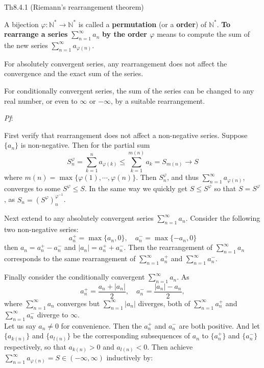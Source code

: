 \documentclass{article}
\begin{document}
\begin{Th}{Th8.4.1 (Riemann's rearrangement theorem)}
    \begin{compactenum}
        \item \textcolor{Df}{A bijection $\varphi: \mathbb{N}^\ast\rightarrow\mathbb{N}^\ast$ is called a \textbf{permutation} (or a \textbf{order}) of $\mathbb{N}^\ast$. \textbf{To rearrange a series } $\sum_{n=1}^{\infty} a_n$ \textbf{by the order $\varphi$} means to compute the sum of the new series $\sum_{n=1}^{\infty} a_{\varphi(n)}$.}
        \item For absolutely convergent series, any rearrangement does not affect the convergence and the exact sum of the series.
        \item For conditionally convergent series, the sum of the series can be changed to any real number, or even to $\infty$ or $-\infty$, by a suitable rearrangement. 
    \end{compactenum}
    \tcblower
    \textit{Pf}: 
    \begin{compactenum}
        \item First verify that rearrangement does not affect a non-negative series. Suppose $\{a_n\}$ is non-negative. Then for the partial sum 
        $$ S_n^\varphi = \sum_{k=1}^{n} a_{\varphi(k)} \leq \sum_{k=1}^{m(n)} a_k = S_{m(n)} \rightarrow S $$
        where $m(n) = \max\{\varphi(1), \cdots, \varphi(n)\}$. Then $S_n^\varphi$, and thus $\sum_{n=1}^{\infty} a_{\varphi(n)}$, converges to some $S^\varphi\leq S$. In the same way we quickly get $S\leq S^\varphi$ so that $S = S^\varphi$, as $S_n = (S^\varphi)_n^{\varphi^{-1}}$.
        \item Next extend to any absolutely convergent series $\sum_{n=1}^{\infty} a_n$. Consider the following two non-negative series:
        $$ a_n^+ = \max\{a_n, 0\}, \quad a_n^- = \max\{-a_n, 0\} $$
        then $a_n = a_n^+ - a_n^-$ and $|a_n| = a_n^+ + a_n^-$. Then the rearrangement of $\sum_{n=1}^{\infty} a_n$ corresponds to the same rearrangement of $\sum_{n=1}^{\infty} a_n^+$ and $\sum_{n=1}^{\infty} a_n^-$.
        \item Finally consider the conditionally convergent $\sum_{n=1}^{\infty} a_n$. As
        $$ a_n^+ = \frac{a_n + |a_n|}{2}, \quad a_n^- = \frac{|a_n| - a_n}{2}, $$
        where $\sum_{n=1}^{\infty} a_n$ converges but $\sum_{n=1}^{\infty} |a_n|$ diverges, both of $\sum_{n=1}^{\infty} a_n^+$ and $\sum_{n=1}^{\infty} a_n^-$ diverge to $\infty$. \\ 
        Let us say $a_n\neq 0$ for convenience. Then the $a_n^+$ and $a_n^-$ are both positive. And let $\{a_{k(n)}\}$ and $\{a_{l(n)}\}$ be the corresponding subsequences of $a_n$ to $\{a_n^+\}$ and $\{a_n^-\}$ respectively, so that $a_{k(n)}>0$ and $a_{l(n)}<0$. Then achieve $\sum_{n=1}^{\infty} a_{\varphi(n)} = S\in (-\infty, \infty)$ inductively by:

\end{compactenum}
\end{Th}
\end{document}
